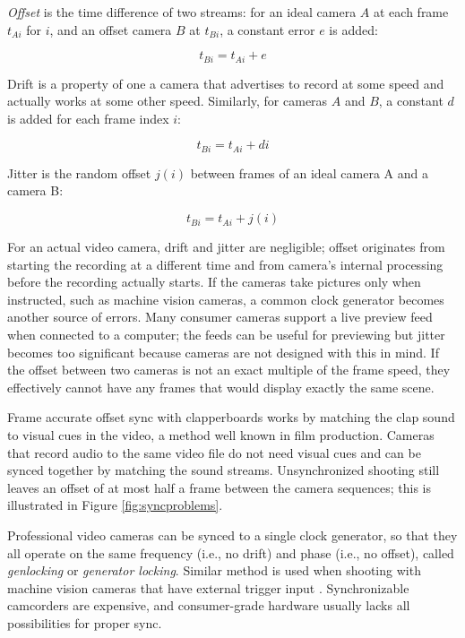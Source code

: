 \emph{Offset} is the time difference of two streams: for an ideal camera $A$ at each frame $t_{Ai}$ for $i$, and an offset camera $B$ at $t_{Bi}$, a constant error $e$ is added:

\begin{equation} \label{eq:timeoffset}
	t_{Bi} = t_{Ai} + e
\end{equation}

Drift is a property of one a camera that advertises to record at some speed and actually works at some other speed. Similarly, for cameras $A$ and $B$, a constant $d$ is added for each frame index $i$:

\begin{equation} \label{eq:timedrift}
	t_{Bi} = t_{Ai} + d i
\end{equation}

Jitter is the random offset $j(i)$ between frames of an ideal camera A and a camera B:

\begin{equation} \label{eq:timejitter}
	t_{Bi} = t_{Ai} + j(i)
\end{equation}

For an actual video camera, drift and jitter are negligible; offset originates from starting the recording at a different time and from camera's internal processing before the recording actually starts.
If the cameras take pictures only when instructed, such as machine vision cameras, a common clock generator becomes another source of errors.
Many consumer cameras support a live preview feed when connected to a computer; the feeds can be useful for previewing but jitter becomes too significant because cameras are not designed with this in mind.
If the offset between two cameras is not an exact multiple of the frame speed, they effectively cannot have any frames that would display exactly the same scene.

Frame accurate offset sync with clapperboards works by matching the clap sound to visual cues in the video, a method well known in film production.
Cameras that record audio to the same video file do not need visual cues and can be synced together by matching the sound streams.
Unsynchronized shooting still leaves an offset of at most half a frame between the camera sequences; this is illustrated in Figure \ref{fig:syncproblems}.

Professional video cameras can be synced to a single clock generator, so that they all operate on the same frequency (i.e., no drift) and phase (i.e., no offset), called \emph{genlocking} or \emph{generator locking}.
Similar method is used when shooting with machine vision cameras that have external trigger input \cite{poynton1996technical}.
Synchronizable camcorders are expensive, and consumer-grade hardware usually lacks all possibilities for proper sync.

